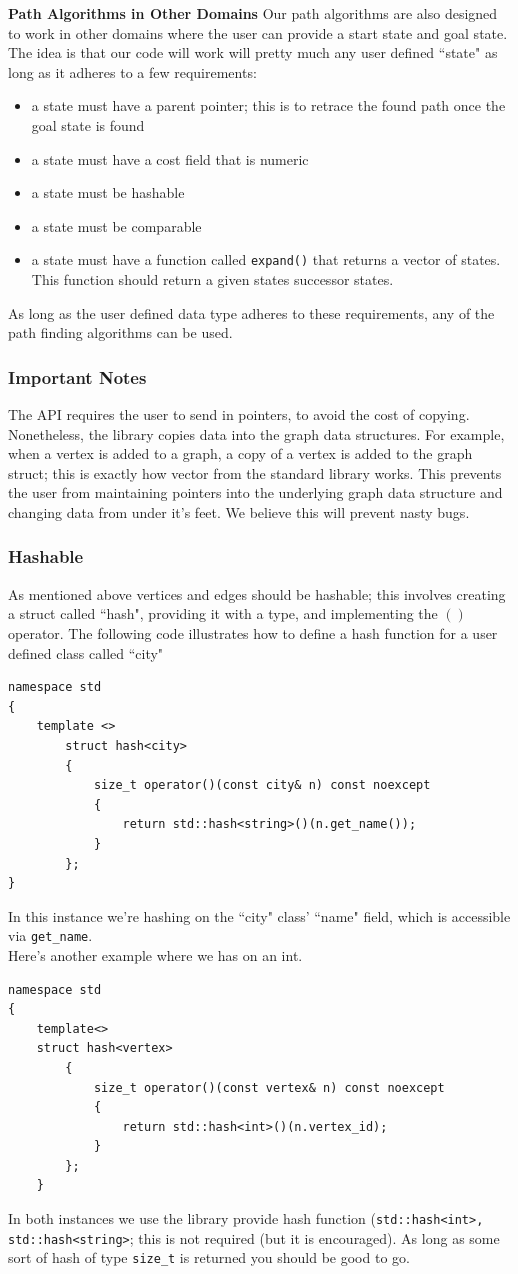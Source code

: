 \documentclass{article}
\begin{document}
\textbf{Path Algorithms in Other Domains}
Our path algorithms are also designed to work in other domains where the user can provide a start state and goal state. The idea is that our code will work will pretty much any user defined ``state" as long as it adheres to a few requirements:
\begin{itemize}
\item a state must have a parent pointer; this is to retrace the found path once the goal state is found
\item a state must have a cost field that is numeric
\item a state must be hashable
\item a state must be comparable
\item a state must have a function called \texttt{expand()} that returns a vector of states. This function should return a given states successor states.
\end{itemize}
As long as the user defined data type adheres to these requirements, any of the path finding algorithms can be used.

\subsubsection{Important Notes}
The API requires the user to send in pointers, to avoid the cost of copying. Nonetheless, the library copies data into the graph data structures. For example, when a vertex is added to a graph, a copy of a vertex is added to the graph struct; this is exactly how vector from the standard library works. This prevents the user from maintaining pointers into the underlying graph data structure and changing data from under it's feet. We believe this will prevent nasty bugs.

\subsubsection{Hashable}
As mentioned above vertices and edges should be hashable; this involves creating a struct called ``hash", providing it with a type, and implementing the $()$ operator. The following code illustrates how to define a hash function for a user defined class called ``city"

\begin{lstlisting}
namespace std
{
	template <>
		struct hash<city>
		{
			size_t operator()(const city& n) const noexcept
			{
				return std::hash<string>()(n.get_name());
			}
		};
}
\end{lstlisting}
In this instance we're hashing on the ``city" class' ``name" field, which is accessible via \texttt{get\_name}.
\\
Here's another example where we has on an int.
\begin{lstlisting}
namespace std
{
	template<>
	struct hash<vertex>
		{
			size_t operator()(const vertex& n) const noexcept
			{
				return std::hash<int>()(n.vertex_id);
			}
		};
	}
\end{lstlisting}
In both instances we use the library provide hash function (\texttt{std::hash<int>, std::hash<string>}; this is not required (but it is encouraged). As long as some sort of hash of type \texttt{size\_t} is returned you should be good to go.
\end{document}
